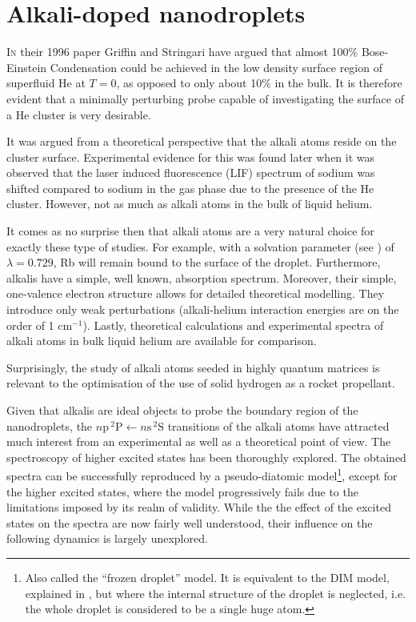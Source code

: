 \chapter{Alkali-doped nanodroplets}

	\lettrine[lines=4]{\color{activeColor}I}{n} their 1996 paper\citep{Griffin1996} Griffin and Stringari have argued that almost 100\% Bose-Einstein Condensation could be achieved in the low density surface region of superfluid He at $T=0$, as opposed to only about 10\% in the bulk. It is therefore evident that a minimally perturbing probe capable of investigating the surface of a He cluster is very desirable.

	It was argued from a theoretical perspective\citep{Dalfovo1994} that the alkali atoms reside on the cluster surface. Experimental evidence for this was found\citep{Stienkemeier1995-1,Stienkemeier1995-2,Ancilotto1995-1} later when it was observed that the laser induced fluorescence (LIF) spectrum of sodium was shifted compared to sodium in the gas phase due to the presence of the He cluster. However, not as much as alkali atoms in the bulk of liquid helium.
	
	It comes as no surprise then that alkali atoms are a very natural choice for exactly these type of studies.  For example, with a solvation parameter (see ) of $\lambda=0.729$\citep{Anc95}, Rb will remain bound to the surface of the droplet. Furthermore, alkalis have a simple, well known, absorption spectrum. Moreover, their simple, one-valence electron structure allows for detailed theoretical modelling. They introduce only weak perturbations (alkali-helium interaction energies are on the order of 1 cm$^{-1}$\citep{Pat91}). Lastly, theoretical calculations\citep{Ancilotto1995-2,Kanorsky1994} and experimental spectra\citep{Tabbert1995,Takahashi1993,Beijersbergen1993} of alkali atoms in bulk liquid helium are available for comparison.

	Surprisingly, the study of alkali atoms seeded in highly quantum matrices is relevant to the optimisation of the use of solid hydrogen as a rocket propellant\citep{Carrick1993}.
	
	Given that alkalis are ideal objects to probe the boundary region of the nanodroplets, the $n\mathrm{p}\,^2\mathrm{P}\!\longleftarrow\!n\mathrm{s}\,^2\mathrm{S}$ transitions of the alkali atoms have attracted much interest from an experimental as well as a theoretical point of view. The spectroscopy of higher excited states has been thoroughly explored\citep{Log11b,Log11a,Lackner2012,Lackner2013,The11,Fec12,Pif10,Lac11,Theisen2011,Lac13}. The obtained spectra can be successfully reproduced by a pseudo-diatomic model\footnote{Also called the ``frozen droplet'' model. It is equivalent to the DIM model, explained in , but where the internal structure of the droplet is neglected, i.e. the whole droplet is considered to be a single huge atom.}, except for the higher excited states, where the model progressively fails due to the limitations imposed by its realm of validity\citep{Sti96,Bunermann2007}. While the the effect of the excited states on the spectra are now fairly well understood, their influence on the following dynamics is largely unexplored.
	
